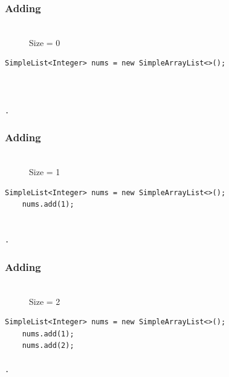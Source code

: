 \documentclass{beamer}
\begin{document}
\begin{frame}[fragile]
    \frametitle{Adding}
    \begin{figure}
        \centering
        \\Size = 0
    \end{figure}
    \vfill
    \begin{lstlisting}[basicstyle=\small]
    SimpleList<Integer> nums = new SimpleArrayList<>();



.
    \end{lstlisting}
\end{frame}

\begin{frame}[fragile]
    \frametitle{Adding}
    \begin{figure}
        \centering
        \\Size = 1
    \end{figure}
    \vfill
    \begin{lstlisting}[basicstyle=\small]
    SimpleList<Integer> nums = new SimpleArrayList<>();
    nums.add(1);


.
    \end{lstlisting}
\end{frame}

\begin{frame}[fragile]
    \frametitle{Adding}
    \begin{figure}
        \centering
        \\Size = 2
    \end{figure}
    \vfill
    \begin{lstlisting}[basicstyle=\small]
    SimpleList<Integer> nums = new SimpleArrayList<>();
    nums.add(1);
    nums.add(2);

.
    \end{lstlisting}
\end{frame}
\end{document}
